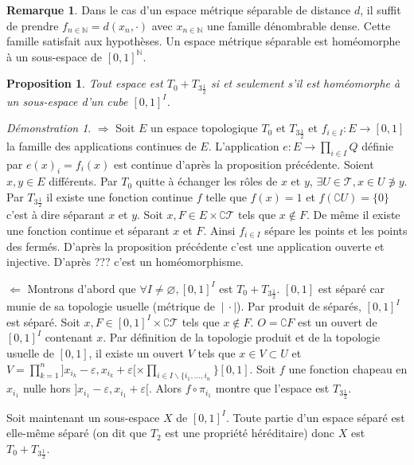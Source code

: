 \documentclass[a4paper, 11pt, french]{book}
\newenvironment{itemise}{\itemize}{\enditemize}
\theoremstyle{plain} %
\newtheorem{proposition}{Proposition}
\theoremstyle{definition} %
\newtheorem{remarque}{Remarque}
\theoremstyle{remark} %
\newtheorem*{demonstration}{Démonstration}
\renewcommand{\setminus}{\backslash}
\newcommand{\1}{\mathds{1}}
\newcommand\vide{\varnothing}
\newcommand{\N}{\mathbb{N}}
\newcommand{\scr}[1]{\mathscr{#1}}
\newcommand\ens[2]{\{#1 \ |\ #2\}}
\begin{document}
\begin{remarque}
	Dans le cas d'un espace métrique séparable de distance $d$, il suffit de prendre $f_{n\in\N}=d(x_n, \cdot)$ avec $x_{n\in\N}$ une famille dénombrable dense.
	Cette famille satisfait aux hypothèses.
	Un espace métrique séparable est homéomorphe à un sous-espace de $[0, 1]^\N$.
\end{remarque}

\begin{proposition}
	Tout espace est $T_0+T_{3\frac{1}{2}}$ si et seulement s'il est homéomorphe à un sous-espace d'un cube $[0, 1]^I$.
\end{proposition}

\begin{demonstration}
	\begin{itemise}
		\item[$\Rightarrow$] Soit $E$ un espace topologique $T_0$ et $T_{3\frac{1}{2}}$ et $f_{i\in I}:E\rightarrow [0, 1]$ la famille des applications continues de $E$.
		L'application $e:E\rightarrow \prod_{i\in I}Q$ définie par $e(x)_i=f_i(x)$ est continue d'après la proposition précédente.
		Soient $x, y\in E$ différents.
		Par $T_0$ quitte à échanger les rôles de $x$ et $y$, $\exists U\in\scr{T}, x\in U\not\ni y$.
		Par $T_{3\frac{1}{2}}$ il existe une fonction continue $f$ telle que $f(x)=1$ et $f(\complement U)=\ens{0\}$ c'est à dire séparant $x$ et $y$.
		Soit $x, F\in E\times\complement\scr{T}$ tels que $x\notin F$.
		De même il existe une fonction continue et séparant $x$ et $F$.
		Ainsi $f_{i\in I}$ sépare les points et les points des fermés.
		D'après la proposition précédente c'est une application ouverte et injective.
		D'après {\color{red} ???} c'est un homéomorphisme.
		\item[$\Leftarrow$] Montrons d'abord que $\forall I\neq\vide, [0, 1]^I$ est $T_0+T_{3\frac{1}{2}}$.
		$[0, 1]$ est séparé car munie de sa topologie usuelle (métrique de $}{\cdot|$).
		Par produit de séparés, $[0, 1]^I$ est séparé.
		Soit $x, F\in[0, 1]^I\times\complement\scr{T}$ tels que $x\notin F$.
		$O=\complement F$ est un ouvert de $[0, 1]^I$ contenant $x$.
		Par définition de la topologie produit et de la topologie usuelle de $[0, 1]$, il existe un ouvert $V$ tels que $x\in V\subset U$ et $V=\prod_{k=1}^n]x_{i_k}-\varepsilon, x_{i_k}+\varepsilon[\times\prod_{i\in I\setminus\{i_1, ..., i_n}}[0, 1]$.
					Soit $f$ une fonction chapeau en $x_{i_1}$ nulle hors $]x_{i_1}-\varepsilon, x_{i_1}+\varepsilon[$.
		Alors $f\circ\pi_{i_1}$ montre que l'espace est $T_{3\frac{1}{2}}$.

		Soit maintenant un sous-espace $X$ de $[0, 1]^I$.
		Toute partie d'un espace séparé est elle-même séparé (on dit que $T_2$ est une propriété héréditaire) donc $X$ est $T_0+T_{3\frac{1}{2}}$.
	\end{itemise}
\end{demonstration}
\end{document}
